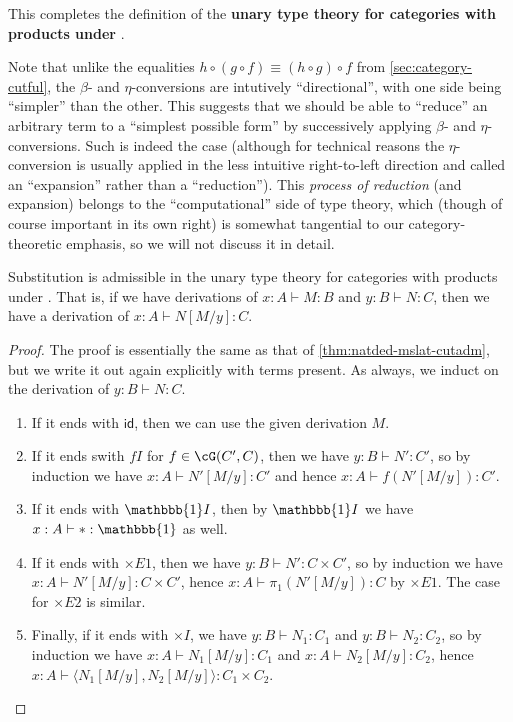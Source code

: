 \documentclass{book}
\def\idfunc{\mathsf{id}}
\let\types\vdash
\def\unit{\mathbbb{1}}%
\def\ttt{\mathord{\ast}}%
\def\timesE{\ensuremath{\mathord{\times}E}}
\def\timesI{\ensuremath{\mathord{\times}I}}
\def\pair#1#2{\langle #1,#2\rangle}
\begin{document}
This completes the definition of the \textbf{unary type theory for categories with products under \cG}.

\begin{rmk}\label{rmk:beta-reduction}
  Note that unlike the equalities $h\circ (g\circ f) \equiv (h\circ g)\circ f$ from \cref{sec:category-cutful}, the $\beta$- and $\eta$-conversions are intutively ``directional'', with one side being ``simpler'' than the other.
  This suggests that we should be able to ``reduce'' an arbitrary term to a ``simplest possible form'' by successively applying $\beta$- and $\eta$-conversions.
  Such is indeed the case (although for technical reasons the $\eta$-conversion is usually applied in the less intuitive right-to-left direction and called an ``expansion'' rather than a ``reduction'').
  This \emph{process of reduction} (and expansion) belongs to the ``computational'' side of type theory, which (though of course important in its own right) is somewhat tangential to our category-theoretic emphasis, so we will not discuss it in detail.
\end{rmk}

\begin{thm}\label{thm:catprod-subadm}
  Substitution is admissible in the unary type theory for categories with products under \cG.
  That is, if we have derivations of $x:A\types M:B$ and $y:B \types N:C$, then we have a derivation of $x:A \types N[M/y]:C$.
\end{thm}
\begin{proof}
  The proof is essentially the same as that of \cref{thm:natded-mslat-cutadm}, but we write it out again explicitly with terms present.
  As always, we induct on the derivation of $y:B \types N:C$.
  \begin{enumerate}
  \item If it ends with $\idfunc$, then we can use the given derivation $M$.
  \item If it ends swith $fI$ for $f\in \cG(C',C)$, then we have $y:B \types N':C'$, so by induction we have $x:A\types N'[M/y]:C'$ and hence $x:A\types f(N'[M/y]):C'$.
  \item If it ends with $\unit I$, then by $\unit I$ we have $x:A \types \ttt:\unit$ as well.
  \item If it ends with $\timesE1$, then we have $y:B\types N':C\times C'$, so by induction we have $x:A \types N'[M/y]:C\times C'$, hence $x:A \types \pi_1(N'[M/y]):C$ by $\timesE1$.
    The case for $\timesE2$ is similar.
  \item Finally, if it ends with $\timesI$, we have $y:B\types N_1:C_1$ and $y:B\types N_2:C_2$, so by induction we have $x:A \types N_1[M/y]:C_1$ and $x:A \types N_2[M/y]:C_2$, hence $x:A \types \pair{N_1[M/y]}{N_2[M/y]}:C_1\times C_2$.\qedhere
  \end{enumerate}
\end{proof}
\end{document}
